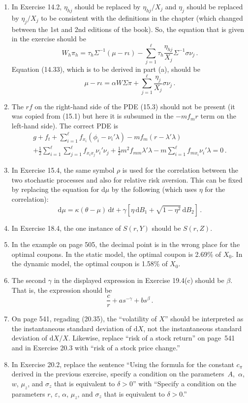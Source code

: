\documentclass[11pt]{book}
\newcommand{\D}{\mathrm{d}}
\theoremstyle{definition}
\begin{document}
\begin{enumerate}
\item In Exercise 14.2, $\eta_{hj}$ should be replaced by $\eta_{hj}/X_j$ and $\eta_j$ should be replaced by $\eta_j/X_j$ to be consistent with the definitions in the chapter (which changed between the 1st and 2nd editions of the book). So, the equation that is given in the exercise should be
$$W_h \pi_h = \tau_h\Sigma^{-1}(\mu-r\iota) - \sum_{j=1}^\ell \tau_h\frac{\eta_{hj}}{X_j}\Sigma^{-1}\sigma\nu_j\,.$$
Equation (14.33), which is to be derived in part (a), should be
$$\mu-r\iota = \alpha W \Sigma \pi + \sum_{j=1}^\ell \frac{\eta_j}{X_j}\sigma\nu_j\,.$$
\item The $rf$ on the right-hand side of the PDE (15.3) should not be present (it was copied from (15.1) but here it is subsumed in the $-mf_mr$ term on the left-hand side).  The correct PDE is
\begin{multline*}
g+ f_t  + \sum_{i=1}^\ell f_{x_i}(\phi_i-\nu_i'\lambda) - mf_m(r-\lambda'\lambda) \\ + \frac{1}{2}\sum_{i=1}^\ell \sum_{j=1}^\ell f_{x_ix_j} \nu_i'\nu_j + \frac{1}{2}m^2f_{mm}\lambda'\lambda - m \sum_{i=1}^\ell f_{mx_i}\nu_i'\lambda
= 0\,.
\end{multline*}
\item In Exercise 15.4, the same symbol $\rho$ is used for the correlation between the two stochastic processes and also for relative risk aversion.  This can be fixed by replacing the equation for $\D \mu$ by the following (which uses $\eta$ for the correlation): 
	$$\D \mu  = \kappa(\theta-\mu)\,\D t + \gamma\left[\eta\,\D B_1 + \sqrt{1-\eta^2}\,\D B_2\right]\,.$$
	\item In Exercise 18.4, the one instance of $S(r,Y)$ should be $S(r,Z)$.
\item In the example on page 505, the decimal point is in the wrong place for the optimal coupons.  In the static model, the optimal coupon is 2.69\% of $X_0$.  In the dynamic model, the optimal coupon is 1.58\% of $X_0$.
\item The second $\gamma$ in the displayed expression in Exercise 19.4(c) should be $\beta$.  That is, the expression should be
$$\frac{c}{r} + as^{-\gamma} + bs^\beta\,.$$
\item On page 541, regading (20.35), the ``volatility of $X$'' should be interpreted as the instantaneous standard deviation of $\D X$, not the instantaneous standard deviation of $\D X/X$.  Likewise, replace ``risk of a stock return'' on page~541 and in Exercise 20.3 with ``risk of a stock price change.''
\item In Exercise 20.2, replace the sentence ``Using the formula for the constant $c_\pi$ derived in the previous exercise, specify a condition on the parameters~$A$,~$\alpha$,~$w$, $\mu_z$, and $\sigma_z$ that is equivalent to $\delta>0$''  with ``Specify a condition on the parameters $r$, $\varepsilon$, $\alpha$, $\mu_z$, and $\sigma_z$ that is equivalent to $\delta>0$.''

\end{enumerate}
\end{document}

